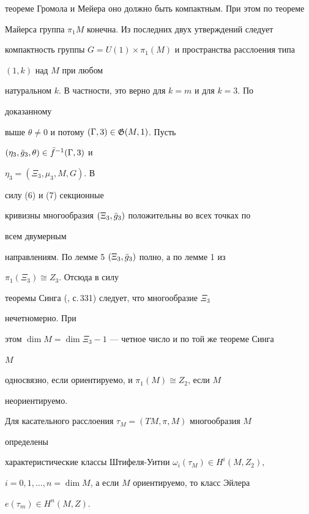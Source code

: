 \begin{pf}
теореме Громола и Мейера оно должно быть компактным. При этом по теореме 


Майерса группа $\pi_1M$ конечна. Из последних двух утверждений следует 


компактность группы $G=U(1)\times\pi_1(M)$ и пространства расслоения типа 


$(1,k)$ над $M$ при любом 


натуральном $k$. В частности, это верно для $k=m$ и для $k=3$. По 


доказанному 


выше $\theta\ne 0$ и потому $(\Gamma,3)\in\frak G(M,1)$. Пусть 


$(\eta_3,\Bar g_3,\theta)\in\Bar f^{-1}(\Gamma,3)$ и 


$\eta_3=(\Xi_3,\mu_3,M,G)$. В 


силу (6) и (7) секционные 


кривизны многообразия $(\Xi_3,\Bar g_3)$ положительны во всех точках по 


всем двумерным 


направлениям. По лемме 5 $(\Xi_3,\Bar g_3)$ полно, а по лемме 1 из 


\cite{Yak} $\pi_1(\Xi_3)\cong Z_3$. Отсюда в силу 


теоремы Синга (\cite{Kob}, с.\,331) следует, что многообразие $\Xi_3$ 


нечетномерно. При 


этом $\dim M=\dim\Xi_3-1$ --- четное число и по той же теореме Синга 


$M$ 


односвязно, если ориентируемо, и $\pi_1(M)\cong Z_2$, если $M$ 


неориентируемо. 


\end{pf} 


 


Для касательного расслоения $\tau_M=(TM,\pi,M)$ многообразия $M$ 


определены 


характеристические классы Штифеля-Уитни $\omega_i(\tau_M)\in H^i(M,Z_2)$, 


$i=0,1,\dotsc,n=\dim M$, а если $M$ ориентируемо, то класс Эйлера 


$e(\tau_m)\in H^n(M,Z)$. 


 


